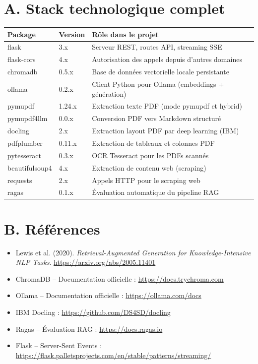 \documentclass[12pt,a4paper]{report}
\begin{document}
\section*{A. Stack technologique complet}
\begin{center}
\renewcommand{\arraystretch}{1.4}
\begin{tabularx}{\linewidth}{>{\ttfamily}p{3.5cm} p{2cm} X}
  \toprule
  \rowcolor{rowblue}
  \textbf{Package} & \textbf{Version} & \textbf{R\^{o}le dans le projet} \\
  \midrule
  flask        & 3.x   & Serveur REST, routes API, streaming SSE \\
  flask-cors   & 4.x   & Autorisation des appels depuis d'autres domaines \\
  chromadb     & 0.5.x & Base de donn\'{e}es vectorielle locale persistante \\
  ollama       & 0.2.x & Client Python pour Ollama (embeddings + g\'{e}n\'{e}ration) \\
  pymupdf      & 1.24.x& Extraction texte PDF (mode pymupdf et hybrid) \\
  pymupdf4llm  & 0.0.x & Conversion PDF vers Markdown structur\'{e} \\
  docling      & 2.x   & Extraction layout PDF par deep learning (IBM) \\
  pdfplumber   & 0.11.x& Extraction de tableaux et colonnes PDF \\
  pytesseract  & 0.3.x & OCR Tesseract pour les PDFs scann\'{e}s \\
  beautifulsoup4 & 4.x & Extraction de contenu web (scraping) \\
  requests     & 2.x   & Appels HTTP pour le scraping web \\
  ragas        & 0.1.x & \'{E}valuation automatique du pipeline RAG \\
  \bottomrule
\end{tabularx}
\end{center}

\section*{B. R\'{e}f\'{e}rences}
\begin{itemize}[leftmargin=*]
  \item Lewis et al. (2020). \textit{Retrieval-Augmented Generation for Knowledge-Intensive NLP Tasks}.
        \url{https://arxiv.org/abs/2005.11401}
  \item ChromaDB -- Documentation officielle : \url{https://docs.trychroma.com}
  \item Ollama -- Documentation officielle : \url{https://ollama.com/docs}
  \item IBM Docling : \url{https://github.com/DS4SD/docling}
  \item Ragas -- \'{E}valuation RAG : \url{https://docs.ragas.io}
  \item Flask -- Server-Sent Events : \url{https://flask.palletsprojects.com/en/stable/patterns/streaming/}
\end{itemize}
\end{document}
